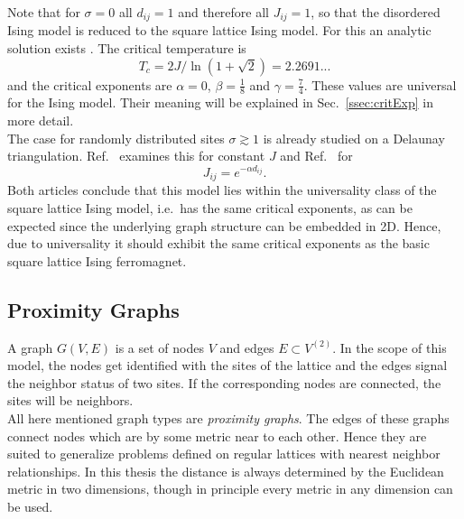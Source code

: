     Note that for \(\sigma = 0\) all \(d_{ij} = 1\) and therefore all
    \(J_{ij} = 1\), so that the disordered Ising model is reduced to the
    square lattice Ising model. For this an analytic solution exists \cite{Onsager1944}.
    The critical temperature is
    \begin{equation}
        T_c = 2J/\ln(1+\sqrt 2) = 2.2691...
        \label{eq:exactTc}
    \end{equation}
    and the critical exponents are \(\alpha = 0\), \(\beta = \frac{1}{8}\)
    and \(\gamma = \frac{7}{4}\). These values are universal for the Ising
    model. Their meaning will be explained in Sec.\ \ref{ssec:critExp} in more detail.\\
    The case for randomly distributed sites \(\sigma \gtrsim 1\) is
    already studied on a Delaunay triangulation. Ref.\ \cite{Janke1994} examines
    this for constant \(J\) and Ref.\ \cite{Lima2000} for
    \begin{equation}
        J_{ij} = e^{-\alpha d_{ij}}.
        \label{eq:coupling}
    \end{equation}
    Both articles conclude that this model lies within the universality
    class of the square lattice Ising model, i.e.\ has the same critical
    exponents, as can be expected since the underlying graph structure can
    be embedded in 2D. Hence, due to universality it should exhibit the same
    critical exponents as the basic square lattice Ising ferromagnet.

\subsection{Proximity Graphs}
\label{ssec:graphtypes}
    A graph \(G(V,E)\) is a set of nodes \(V\) and edges \(E \subset V^(2)\). In the
    scope of this model, the nodes get identified with the sites of the
    lattice and the edges signal the neighbor status of two sites. If the
    corresponding nodes are connected, the sites will be neighbors.\\
    All here mentioned graph types are \emph{proximity graphs}.
    The edges of these graphs connect nodes which are by some metric near
    to each other.
    Hence they are suited to generalize problems defined on regular
    lattices with nearest neighbor relationships.
    In this thesis the distance is always determined by the Euclidean
    metric in two dimensions, though in principle every metric in any
    dimension can be used.\\

